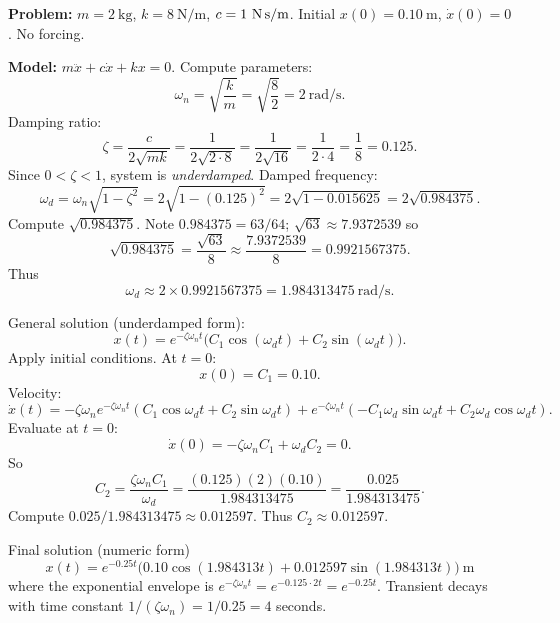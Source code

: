     \begin{example}
      \textbf{Problem:} \(m=2\ \text{kg}\), \(k=8\ \text{N/m}\), \(c=1\ \text{N\,s/m}\). Initial \(x(0)=0.10\ \text{m}\), \(\dot x(0)=0\). No forcing.

      \textbf{Model:} \(m\ddot x + c\dot x + kx = 0\). Compute parameters:
      \[
      \omega_n = \sqrt{\frac{k}{m}} = \sqrt{\frac{8}{2}} = 2\ \text{rad/s}.
      \]
      Damping ratio:
      \[
      \zeta = \frac{c}{2\sqrt{mk}} = \frac{1}{2\sqrt{2\cdot 8}} = \frac{1}{2\sqrt{16}} = \frac{1}{2\cdot 4} = \frac{1}{8} = 0.125.
      \]
      Since \(0<\zeta<1\), system is \emph{underdamped}. Damped frequency:
      \[
      \omega_d = \omega_n\sqrt{1-\zeta^2}
      = 2\sqrt{1-(0.125)^2}
      = 2\sqrt{1-0.015625}
      =2\sqrt{0.984375}.
      \]
      Compute \(\sqrt{0.984375}\). Note \(0.984375=63/64\); \(\sqrt{63}\approx 7.9372539\) so
      \[
      \sqrt{0.984375}=\frac{\sqrt{63}}{8}\approx \frac{7.9372539}{8}=0.9921567375.
      \]
      Thus
      \[
      \omega_d \approx 2\times 0.9921567375 = 1.984313475\ \text{rad/s}.
      \]

      General solution (underdamped form):
      \[
      x(t) = e^{-\zeta\omega_n t}\big( C_1\cos(\omega_d t) + C_2\sin(\omega_d t)\big).
      \]
      Apply initial conditions. At \(t=0\):
      \[
      x(0)=C_1 = 0.10.
      \]
      Velocity:
      \[
      \dot x(t) = -\zeta\omega_n e^{-\zeta\omega_n t}(C_1\cos\omega_d t + C_2\sin\omega_d t)
      + e^{-\zeta\omega_n t}(-C_1\omega_d\sin\omega_d t + C_2\omega_d\cos\omega_d t).
      \]
      Evaluate at \(t=0\):
      \[
      \dot x(0) = -\zeta\omega_n C_1 + \omega_d C_2 = 0.
      \]
      So
      \[
      C_2 = \frac{\zeta\omega_n C_1}{\omega_d} = \frac{(0.125)(2)(0.10)}{1.984313475} = \frac{0.025}{1.984313475}.
      \]
      Compute \(0.025/1.984313475 \approx 0.012597\). Thus \(C_2\approx 0.012597\).

      Final solution (numeric form)
      \[
      \boxed{\,x(t) = e^{-0.25 t}\big(0.10\cos(1.984313t) + 0.012597\sin(1.984313t)\big)\ \text{m}\,}
      \]
      where the exponential envelope is \(e^{-\zeta\omega_n t}=e^{-0.125\cdot 2 t}=e^{-0.25t}\).
      Transient decays with time constant \(1/( \zeta\omega_n)=1/0.25=4\) seconds.
    \end{example}


